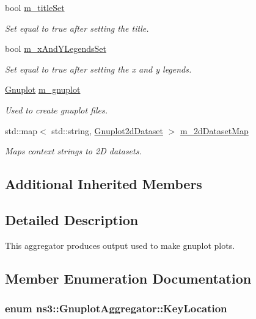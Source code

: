 \begin{DoxyCompactItemize}
bool \hyperlink{classns3_1_1GnuplotAggregator_a43ddb8f3edfd6d01c2f18f9fef04c1bd}{m\+\_\+title\+Set}
\begin{DoxyCompactList}\small\item\em Set equal to true after setting the title. \end{DoxyCompactList}\item 
bool \hyperlink{classns3_1_1GnuplotAggregator_a1eb3308b08bc0b37b7d46c8908d14db7}{m\+\_\+x\+And\+Y\+Legends\+Set}
\begin{DoxyCompactList}\small\item\em Set equal to true after setting the x and y legends. \end{DoxyCompactList}\item 
\hyperlink{classns3_1_1Gnuplot}{Gnuplot} \hyperlink{classns3_1_1GnuplotAggregator_a152975e86bbfbc344ff39d8917a9190f}{m\+\_\+gnuplot}
\begin{DoxyCompactList}\small\item\em Used to create gnuplot files. \end{DoxyCompactList}\item 
std\+::map$<$ std\+::string, \hyperlink{classns3_1_1Gnuplot2dDataset}{Gnuplot2d\+Dataset} $>$ \hyperlink{classns3_1_1GnuplotAggregator_aaa1508290f7ad7656a5081a094d5a635}{m\+\_\+2d\+Dataset\+Map}
\begin{DoxyCompactList}\small\item\em Maps context strings to 2D datasets. \end{DoxyCompactList}\end{DoxyCompactItemize}
\subsection*{Additional Inherited Members}


\subsection{Detailed Description}
This aggregator produces output used to make gnuplot plots. 

\subsection{Member Enumeration Documentation}
\subsubsection[{\texorpdfstring{Key\+Location}{KeyLocation}}]{\setlength{\rightskip}{0pt plus 5cm}enum {\bf ns3\+::\+Gnuplot\+Aggregator\+::\+Key\+Location}}\hypertarget{classns3_1_1GnuplotAggregator_a84f2dafa52bb704042bc13c6cd6ee216}{}\label{classns3_1_1GnuplotAggregator_a84f2dafa52bb704042bc13c6cd6ee216}


